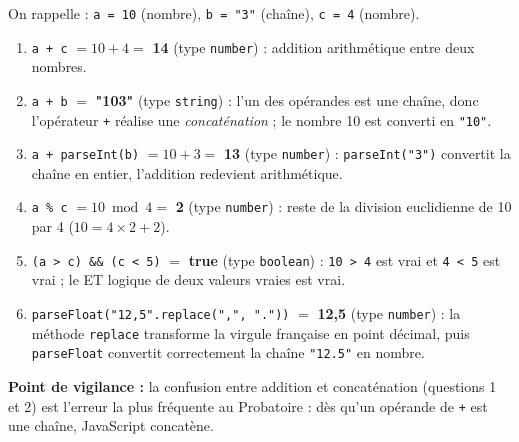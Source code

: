 \documentclass[11pt]{article}
\newcounter{popsec}
\newcounter{popsub}
\newcommand{\courssub}[1]{%
  \stepcounter{popsub}%
  \par\vspace{9pt}\noindent{\popxbold\fontsize{11.5}{13}\selectfont\color{popink}{\color{poporange}\thepopsec.\thepopsub}\hspace{6pt}#1}\par\nopagebreak\vspace{4pt}
}
\begin{document}
\begin{corrige}
On rappelle : \texttt{a = 10} (nombre), \texttt{b = "3"} (chaîne), \texttt{c = 4} (nombre).
\begin{enumerate}
\item \texttt{a + c} $= 10 + 4 =$ \textbf{14} (type \texttt{number}) : addition arithmétique entre deux nombres.
\item \texttt{a + b} $=$ \textbf{"103"} (type \texttt{string}) : l'un des opérandes est une chaîne, donc l'opérateur \texttt{+} réalise une \emph{concaténation} ; le nombre 10 est converti en \texttt{"10"}.
\item \texttt{a + parseInt(b)} $= 10 + 3 =$ \textbf{13} (type \texttt{number}) : \texttt{parseInt("3")} convertit la chaîne en entier, l'addition redevient arithmétique.
\item \texttt{a \% c} $= 10 \bmod 4 =$ \textbf{2} (type \texttt{number}) : reste de la division euclidienne de 10 par 4 ($10 = 4 \times 2 + 2$).
\item \texttt{(a > c) \&\& (c < 5)} $=$ \textbf{true} (type \texttt{boolean}) : \texttt{10 > 4} est vrai et \texttt{4 < 5} est vrai ; le ET logique de deux valeurs vraies est vrai.
\item \texttt{parseFloat("12,5".replace(",", "."))} $=$ \textbf{12,5} (type \texttt{number}) : la méthode \texttt{replace} transforme la virgule française en point décimal, puis \texttt{parseFloat} convertit correctement la chaîne \texttt{"12.5"} en nombre.
\end{enumerate}
\textbf{Point de vigilance :} la confusion entre addition et concaténation (questions 1 et 2) est l'erreur la plus fréquente au Probatoire : dès qu'un opérande de \texttt{+} est une chaîne, JavaScript concatène.
\end{corrige}

\courssub{Je m'entraîne}
\end{document}
